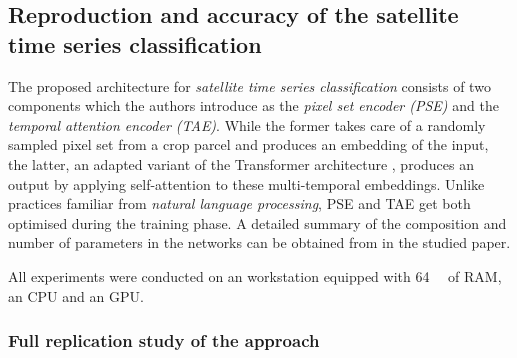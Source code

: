 \subsection{Reproduction and accuracy of the satellite time series classification} \label{sec:reprod_general}

The proposed architecture for \emph{satellite time series classification} consists of two components which the authors introduce as the \emph{pixel set encoder (PSE)} and the \emph{temporal attention encoder (TAE)}.
While the former takes care of a randomly sampled pixel set from a crop parcel and produces an embedding of the input, the latter, an adapted variant of the Transformer architecture \parencite{Vaswani17:Attention}, produces an output by applying self-attention to these multi-temporal embeddings.
Unlike practices familiar from \emph{natural language processing}, PSE and TAE get both optimised during the training phase.
A detailed summary of the composition and number of parameters in the networks can be obtained from  in the studied paper.

All experiments were conducted on an  workstation equipped with \SI{64}{\giga\byte} of RAM, an  CPU and an  GPU.



\subsubsection{Full replication study of the approach} \label{sec:reprod_code}

